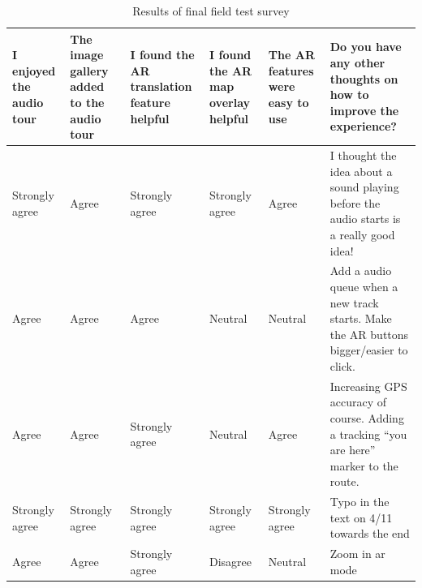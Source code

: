 \documentclass[a4paper, 10pt, american, titlepage]{article}
\begin{document}
\begin{table}[h]
\begin{singlespace}
\renewcommand{\arraystretch}{2.0} %
\footnotesize %
\begin{tabulary}{\textwidth}{ L | L | L | L | L | L }
	I enjoyed the audio tour & The image gallery added to the audio tour & I
	found the AR translation feature helpful & I found the AR map overlay
	helpful & The AR features were easy to use & Do you have any other thoughts
	on how to improve the experience? \\
	\hline

	Strongly agree & Agree & Strongly agree & Strongly agree & Agree & I thought
	the idea about a sound playing before the audio starts is a really good
	idea! \\

	Agree & Agree & Agree & Neutral & Neutral & Add a audio queue when a new
	track starts. Make the AR buttons bigger/easier to click. \\

	Agree & Agree & Strongly agree & Neutral & Agree & Increasing GPS accuracy
	of course. Adding a tracking ``you are here'' marker to the route. \\

	Strongly agree & Strongly agree & Strongly agree & Strongly agree & Strongly
	agree & Typo in the text on 4/11 towards the end \\

	Agree & Agree & Strongly agree & Disagree & Neutral & Zoom in ar mode \\
\end{tabulary}
\end{singlespace}
\caption{Results of final field test survey}
\label{tab:testingSurveyResults}
\end{table}
\end{document}
